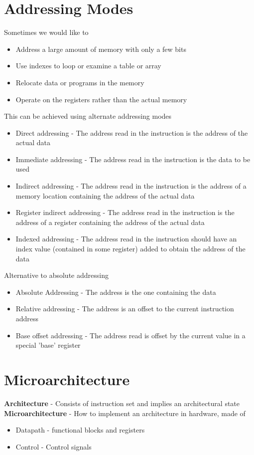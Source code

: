 \documentclass{article}[18pt]
\begin{document}
\section{Addressing Modes}
Sometimes we would like to
\begin{itemize}
	\item Address a large amount of memory with only a few bits
	\item Use indexes to loop or examine a table or array
	\item Relocate data or programs in the memory
	\item Operate on the registers rather than the actual memory
\end{itemize}
This can be achieved using alternate addressing modes
\begin{itemize}
	\item Direct addressing - The address read in the instruction is the address of the actual data
	\item Immediate addressing - The address read in the instruction is the data to be used
	\item Indirect addressing - The address read in the instruction is the address of a memory location containing the address of the actual data
	\item Register indirect addressing - The address read in the instruction is the address of a register containing the address of the actual data
	\item Indexed addressing - The address read in the instruction should have an index value (contained in some register) added to obtain the address of the data
\end{itemize}
Alternative to absolute addressing
\begin{itemize}
	\item Absolute Addressing - The address is the one containing the data
	\item Relative addressing - The address is an offset to the current instruction address
	\item Base offset addressing - The address read is offset by the current value in a special 'base' register
\end{itemize}
\section{Microarchitecture}
\textbf{Architecture} - Consists of instruction set and implies an architectural state\\
\textbf{Microarchitecture} - How to implement an architecture in hardware, made of
\begin{itemize}
	\item Datapath - functional blocks and registers
	\item Control - Control signals
\end{itemize}
\end{document}
